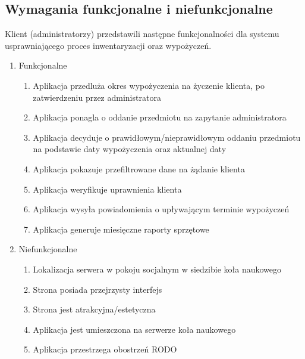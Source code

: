 \documentclass{article}
\begin{document}
    \subsection{Wymagania funkcjonalne i niefunkcjonalne}
    Klient (administratorzy) przedstawili następne funkcjonalności dla systemu usprawniającego proces inwentaryzacji oraz wypożyczeń.
        \begin{enumerate}
            \item Funkcjonalne
            
            \begin{enumerate}
                \item Aplikacja przedluża okres wypożyczenia na życzenie klienta, po zatwierdzeniu przez administratora
                \item Aplikacja ponagla o oddanie przedmiotu na zapytanie administratora
                \item Aplikacja decyduje o prawidłowym/nieprawidłowym oddaniu przedmiotu na podstawie daty wypożyczenia oraz aktualnej daty
                \item Aplikacja pokazuje przefiltrowane dane na żądanie klienta
                \item Aplikacja weryfikuje uprawnienia klienta
                \item Aplikacja wysyła powiadomienia o upływającym terminie wypożyczeń
                \item Aplikacja generuje miesięczne raporty sprzętowe
            \end{enumerate}

            \item Niefunkcjonalne 

            \begin{enumerate}
                \item Lokalizacja serwera w pokoju socjalnym w siedzibie koła naukowego
                \item Strona posiada przejrzysty interfejs
                \item Strona jest atrakcyjna/estetyczna
                \item Aplikacja jest umieszczona na serwerze koła naukowego
                \item Aplikacja przestrzega obostrzeń RODO
            \end{enumerate}
            
        \end{enumerate}
\end{document}
